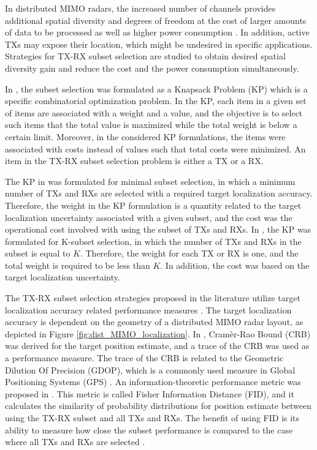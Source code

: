 \documentclass[english, 12pt, a4paper, elec, utf8, a-1b, online]{aaltothesis}
\begin{document}
In distributed MIMO radars, the increased number of channels provides additional spatial diversity and degrees of freedom at the cost of larger amounts of data to be processed as well as higher power consumption \cite{Haimovich2008}.
In addition, active TXs may expose their location, which might be undesired in specific applications.
Strategies for TX-RX subset selection are studied to obtain desired spatial diversity gain and reduce the cost and the power consumption simultaneously.

In \cite{Godrich2011a, Godrich2011}, the subset selection was formulated as a Knapsack
Problem (KP) which is a specific combinatorial optimization problem.
In the KP, each item in a given set of items are associated with a weight and a value, and the objective is to select such items that the total value is maximized while the total weight is below a certain limit.
Moreover, in the considered KP formulations, the items were associated with costs instead of values such that total costs were minimized.
An item in the TX-RX subset selection problem is either a TX or a RX.

The KP in \cite{Godrich2011a} was formulated for minimal subset selection, in which a minimum number of TXs and RXs are selected with a required target localization accuracy.
Therefore, the weight in the KP formulation is a quantity related to the target localization uncertainty associated with a given subset, and the cost was the operational cost involved with using the subset of TXs and RXs.
In \cite{Godrich2011}, the KP was formulated for K-subset selection, in which the number of TXs and RXs in the subset is equal to $K$.
Therefore, the weight for each TX or RX is one, and the total weight is required to be less than $K$.
In addition, the cost was based on the target localization uncertainty.

The TX-RX subset selection strategies proposed in the literature utilize target localization accuracy related performance measures \cite{Godrich2011a, Godrich2011, Sun2014}.
The target localization accuracy is dependent on the geometry of a distributed MIMO radar layout, as depicted in Figure \ref{fig:dist_MIMO_localization}.
In \cite{Godrich2011a, Godrich2011}, Cram\`er-Rao Bound (CRB) was derived for the target position estimate, and a trace of the CRB was used as a performance measure.
The trace of the CRB is related to the Geometric Dilution Of Precision (GDOP), which is a commonly used measure in Global Positioning Systems (GPS) \cite{Sun2014}. 
An information-theoretic performance metric was proposed in \cite{Sun2014}.
This metric is called Fisher Information Distance (FID), and it calculates the similarity of probability distributions for position estimate between using the TX-RX subset and all TXs and RXs.
The benefit of using FID is its ability to measure how close the subset performance is compared to the case where all TXs and RXs are selected \cite{Sun2014}.
\end{document}
